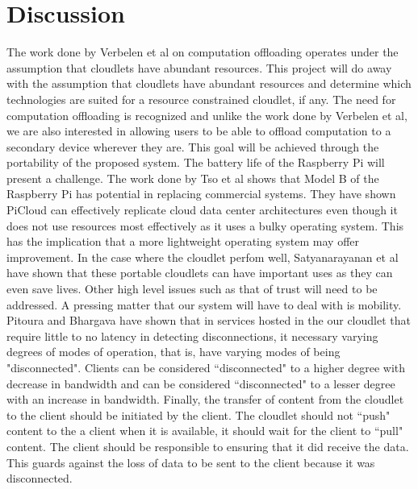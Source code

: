 \section{Discussion}
The work done by Verbelen et al\cite{RefWorks:93} on computation offloading operates under the assumption that cloudlets have abundant resources.
This project will do away with the assumption that cloudlets have abundant resources and determine which technologies are suited for a resource constrained cloudlet, if any. The need for computation offloading is recognized and unlike the work done by Verbelen et al\cite{RefWorks:93}, we are also interested in  allowing users to be able to offload computation to a secondary device wherever they are. This goal will be achieved through the portability of the proposed system. The battery life of the Raspberry Pi will present a challenge. The work done by Tso et al\cite{tso2013glasgow} shows that Model B of the Raspberry Pi has potential in replacing commercial systems. They have shown PiCloud can effectively replicate cloud data center architectures even though it does not use resources most effectively as it uses a bulky operating system. This has the implication that a more lightweight operating system may offer improvement. In the case where the cloudlet perfom well, Satyanarayanan et al\cite{RefWorks:107} have shown that these portable cloudlets can have important uses as they can even save lives. Other high level issues such as that of trust will need to be addressed. A pressing matter that our system will have to deal with is mobility. Pitoura and Bhargava\cite{pitoura1993dealing} have shown that in services hosted in the our cloudlet that require little to no latency in detecting disconnections, it necessary varying degrees of modes of operation, that is, have varying modes of being "disconnected". Clients can be considered ``disconnected" to a higher degree with decrease in bandwidth and can be considered ``disconnected" to a lesser degree with an increase in bandwidth. Finally, the transfer of content from the cloudlet to the client should be initiated by the client. The cloudlet should not ``push" content to the a client when it is available, it should wait for the client to ``pull" content. The client should be responsible to ensuring that it did receive the data. This guards against the loss of data to be sent to the client because it was disconnected.


